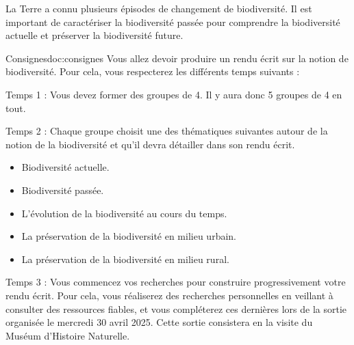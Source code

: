\teteSndAP
\vspace*{-36pt}

\begin{contexte}
  La Terre a connu plusieurs épisodes de changement de biodiversité.
  Il est important de caractériser la biodiversité passée pour comprendre la biodiversité actuelle et préserver la biodiversité future.
\end{contexte}

\begin{doc}{Consignes}{doc:consignes}
Vous allez devoir produire un rendu écrit sur la notion de biodiversité. 
Pour cela, vous respecterez les différents temps suivants :
\begin{listePoints}
\item Temps 1 : Vous devez former des groupes de 4. Il y aura donc 5 groupes de 4 en tout.
\item Temps 2 : Chaque groupe choisit une des thématiques suivantes autour de la notion de la biodiversité et qu’il devra détailler dans son rendu écrit. 
\begin{itemize}
\item Biodiversité actuelle.
\item Biodiversité passée.
\item L’évolution de la biodiversité au cours du temps.
\item La préservation de la biodiversité en milieu urbain.
\item La préservation de la biodiversité en milieu rural.
\end{itemize}
\item Temps 3 : Vous commencez vos recherches pour construire progressivement votre rendu écrit. Pour cela, vous réaliserez des recherches personnelles en veillant à consulter des ressources fiables, et vous compléterez ces dernières lors de la sortie organisée le mercredi 30 avril 2025. Cette sortie consistera en la visite du Muséum d’Histoire Naturelle.
\end{listePoints}    
\end{doc}

